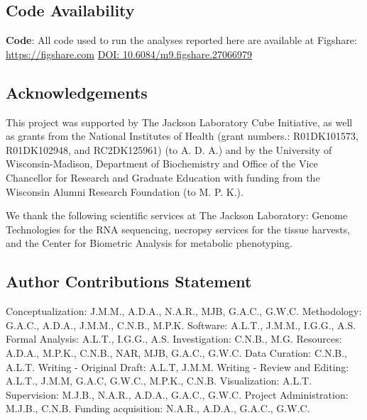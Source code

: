 \documentclass[
]{article}
\begin{document}
\subsection{Code Availability}\label{code-availability}

\textbf{Code}: All code used to run the analyses reported here are
available at Figshare: \url{https://figshare.com}
\href{https://figshare.com/articles/dataset/Data_and_code_for_High-Dimensional_Mediation_Analysis_HDMA_in_diversity_outbred_mice/27066979}{DOI:
10.6084/m9.figshare.27066979} \cite{cube_data}

\pagebreak




\subsection{Acknowledgements}\label{acknowledgements}

This project was supported by The Jackson Laboratory Cube Initiative, as
well as grants from the National Institutes of Health (grant numbers.:
R01DK101573, R01DK102948, and RC2DK125961) (to A. D. A.) and by the
University of Wisconsin-Madison, Department of Biochemistry and Office
of the Vice Chancellor for Research and Graduate Education with funding
from the Wisconsin Alumni Research Foundation (to M. P. K.).

We thank the following scientific services at The Jackson Laboratory:
Genome Technologies for the RNA sequencing, necropsy services for the
tissue harvests, and the Center for Biometric Analysis for metabolic
phenotyping.

\subsection{Author Contributions
Statement}\label{author-contributions-statement}

Conceptualization: J.M.M., A.D.A., N.A.R., MJB, G.A.C., G.W.C.
Methodology: G.A.C., A.D.A., J.M.M., C.N.B., M.P.K. Software: A.L.T.,
J.M.M., I.G.G., A.S. Formal Analysis: A.L.T., I.G.G., A.S.
Investigation: C.N.B., M.G. Resources: A.D.A., M.P.K., C.N.B., NAR, MJB,
G.A.C., G.W.C. Data Curation: C.N.B., A.L.T. Writing - Original Draft:
A.L.T, J.M.M. Writing - Review and Editing: A.L.T., J.M.M, G.A.C,
G.W.C., M.P.K., C.N.B. Visualization: A.L.T. Supervision: M.J.B.,
N.A.R., A.D.A., G.A.C., G.W.C. Project Administration: M.J.B., C.N.B.
Funding acquisition: N.A.R., A.D.A., G.A.C., G.W.C.
\end{document}
